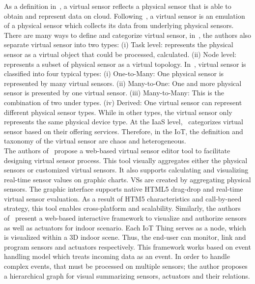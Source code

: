 As a definition in~\cite{GuptaMukherjee2016}, a virtual sensor reflects a physical sensor that is able to obtain and represent data on cloud. Following~\cite{MadriaKumarDalvi2014}, a virtual sensor is an emulation of a physical sensor which collects its data from underlying physical sensors. There are many ways to define and categorize virtual sensor, in~\cite{GuptaMukherjee2016}, the authors also separate virtual sensor into two types: (i) Task level: represents the physical sensor as a virtual object that could be processed, calculated. (ii) Node level: represents a subset of physical sensor as a virtual topology.  In~\cite{MadriaKumarDalvi2014}, virtual sensor is classified into four typical types: (i) One-to-Many: One physical sensor is represented by many virtual sensors. (ii) Many-to-One: One and more physical sensor is presented by one virtual sensor. (iii) Many-to-Many: This is the combination of two under types. (iv) Derived: One virtual sensor can represent different physical sensor types. While in other types, the virtual sensor only represents the same physical device type. At the IaaS level,~\cite{BoseGuptaAdhikaryMukherjee2015} categorizes virtual sensor based on their offering services. Therefore, in the IoT, the definition and taxonomy of the virtual sensor are chaos and heterogeneous. \\

The authors of~\cite{al2013} propose a web-based virtual sensor editor tool to facilitate designing virtual sensor process. This tool visually aggregates either the physical sensors or customized virtual sensors. It also supports calculating and visualizing real-time sensor values on graphic charts. VSs are created by aggregating physical sensors. The graphic interface supports native HTML5 drag-drop and real-time virtual sensor evaluation. As a result of HTM5 characteristics and call-by-need strategy, this tool enables cross-platform and scalability. Similarly, the authors of~\cite{JeongJooHongShinLee2015} present a web-based interactive framework to visualize and authorize sensors as well as actuators for indoor scenario. Each IoT Thing serves as a node, which is visualized within a 3D indoor scene. Thus, the end-user can monitor, link and program sensors and actuators respectively. This framework works based on event handling model which treats incoming data as an event. In order to handle complex events, that must be processed on multiple sensors; the author proposes a hierarchical graph for visual summarizing sensors, actuators and their relations. \\

